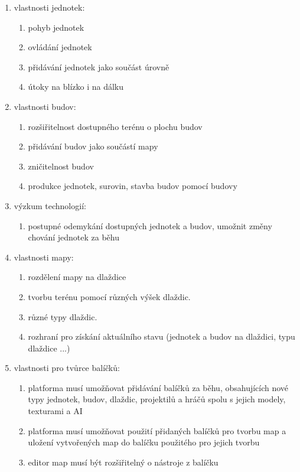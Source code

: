 \documentclass[32pt, a0paper, portrait, margin=2mm, innermargin=10mm, colspace=10mm, subcolspace=8mm, blockverticalspace=10mm]{tikzposter}
\begin{document}
\begin{columns}
{		\begin{enumerate}
			\item vlastnosti jednotek:
				\begin{enumerate}
					\item pohyb jednotek
					\item ovládání jednotek
					\item přidávání jednotek jako součást úrovně
					\item útoky na blízko i na dálku
				\end{enumerate}
			\item vlastnosti budov:
				\begin{enumerate}
					\item rozšiřitelnost dostupného terénu o plochu budov
					\item přidávání budov jako součástí mapy 
					\item zničitelnost budov 
					\item produkce jednotek, surovin, stavba budov pomocí budovy
				\end{enumerate}
			\item výzkum technologií:
				\begin{enumerate}
					\item postupné odemykání dostupných jednotek a budov, umožnit změny chování jednotek za běhu
				\end{enumerate}
			\item vlastnosti mapy:
				\begin{enumerate}
					\item rozdělení mapy na dlaždice
					\item tvorbu terénu pomocí různých výšek dlaždic.
					\item různé typy dlaždic. 
					\item rozhraní pro získání aktuálního stavu  (jednotek a budov na dlaždici, typu dlaždice ...) 
				\end{enumerate}
			\item vlastnosti pro tvůrce balíčků:
				\begin{enumerate}
					\item platforma musí umožňovat přidávání balíčků za běhu, obsahujících
					nové typy jednotek, budov, dlaždic, projektilů a hráčů spolu s jejich
					modely, texturami a AI
					\item platforma musí umožňovat použití přidaných balíčků pro tvorbu map
					a uložení vytvořených map do balíčku použitého pro jejich tvorbu
					\item editor map musí být rozšiřitelný o nástroje z balíčku

\end{enumerate}
\end{enumerate}}
\end{columns}
\end{document}
